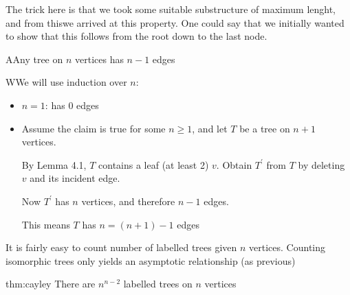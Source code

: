 \noindent The trick here is that we took some suitable substructure of maximum lenght, and from thiswe arrived at this property. One could say that we initially wanted to show that this follows from the root down to the last node.
\par\bigskip
\begin{lem}
  AAny tree on $n$ vertices has $n-1$ edges
\end{lem}
\par\bigskip
\begin{prf}
  WWe will use induction over $n$:\par
  \begin{itemize}
    \item $n=1$: has 0 edges
    \item Assume the claim is true for some $n\geq1$, and let $T$ be a tree on $n+1$ vertices.\par
      By Lemma 4.1, $T$ contains a leaf (at least 2) $v$. Obtain $T^{\prime}$ from $T$ by deleting $v$ and its incident edge.\par
      Now $T^{\prime}$ has $n$ vertices, and therefore $n-1$ edges.\par
      This means $T$ has $n= (n+1)-1$ edges
  \end{itemize}
\end{prf}
\par\bigskip
\noindent It is fairly easy to count number of labelled trees given $n$ vertices. Counting isomorphic trees only yields an asymptotic relationship (as previous)
\par\bigskip
\begin{theo}[Cayley]{thm:cayley}
  There are $n^{n-2}$ labelled trees on $n$ vertices
\end{theo}
\par\bigskip
